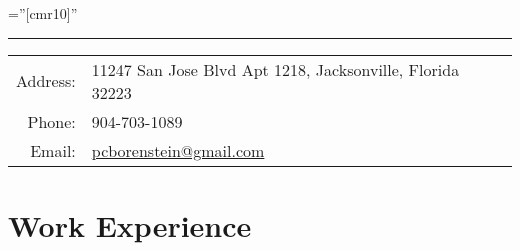 \documentclass[a4paper,10pt]{article} %
\begin{document}
\pagestyle{empty} %

\font\fb=''[cmr10]'' %


\par{\bigskip\par} %
\noindent\rule{14.3cm}{0.4pt}

\begin{tabular}{rl}
Address: &11247 San Jose Blvd Apt 1218, Jacksonville, Florida 32223 \\
Phone: & 904-703-1089\\
Email: & \href{mailto:pcborenstein@gmail.com}{pcborenstein@gmail.com}
\end{tabular}


\section{Work Experience}
\end{document}
